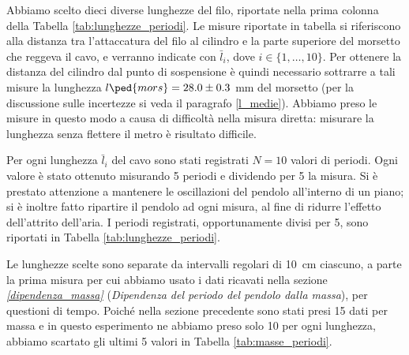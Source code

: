 Abbiamo scelto dieci diverse lunghezze del filo, riportate nella prima colonna della Tabella \ref{tab:lunghezze_periodi}.
Le misure riportate in tabella si riferiscono alla distanza tra l'attaccatura del filo al cilindro e la parte superiore
del morsetto che reggeva il cavo, e verranno indicate con $\bar{l}_i$, dove $i \in \{1, \dots, 10\}$.
Per ottenere la distanza del cilindro dal punto di sospensione è quindi necessario sottrarre a tali misure
la lunghezza $l\ped{mors} = 28.0 \pm 0.3$ mm del morsetto (per la discussione sulle incertezze si veda il paragrafo
\ref{l_medie}). Abbiamo preso le misure in questo modo a causa di difficoltà nella misura diretta:
misurare la lunghezza senza flettere il metro è risultato difficile.

Per ogni lunghezza $\bar{l}_i$ del cavo sono stati registrati $N = 10$ valori di periodi. Ogni valore è stato ottenuto
misurando 5 periodi e dividendo per 5 la misura. Si è prestato attenzione a mantenere le oscillazioni del pendolo
all'interno di un piano; si è inoltre fatto ripartire il pendolo ad ogni misura, al fine di ridurre l'effetto dell'attrito
dell'aria. I periodi registrati, opportunamente divisi per 5, sono riportati in Tabella \ref{tab:lunghezze_periodi}.

Le lunghezze scelte sono separate da intervalli regolari di \SI{10}{\centi\metre} ciascuno, a parte la prima
misura per cui abbiamo usato i dati ricavati nella sezione \emph{\ref{dipendenza_massa}} (\emph{Dipendenza del periodo del pendolo dalla massa}), per questioni di tempo.
Poiché nella sezione precedente sono stati presi 15 dati per massa e in questo esperimento ne abbiamo preso solo 10
per ogni lunghezza, abbiamo scartato gli ultimi 5 valori in Tabella \ref{tab:masse_periodi}.

